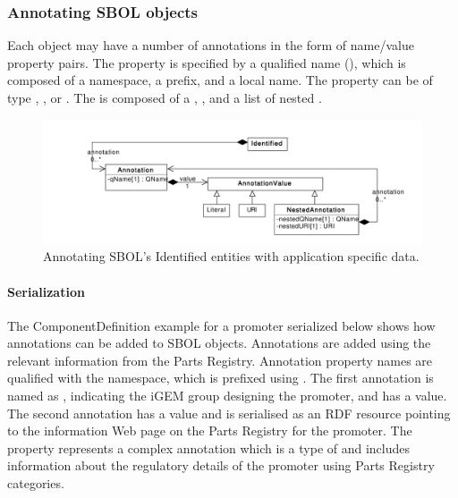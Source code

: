 \subsubsection{Annotating SBOL objects}

Each  object may have a number of annotations in the form of name/value property pairs. The  property is specified by a qualified name (), which is composed of a namespace, a prefix, and a local name. The  property can be of type , , or . The  is composed of a , , and a list of nested .


\begin{figure}[!ht]
\begin{center}
\includegraphics[scale=0.6]{uml/identified_annotations}
\caption[]{Annotating SBOL's Identified entities with application specific data.}
\label{uml:identified_annotations}
\end{center}
\end{figure}

\paragraph{Serialization}
The ComponentDefinition example for a promoter serialized below shows how annotations can be added to SBOL objects. Annotations are added using the relevant information from the Parts Registry. Annotation property names are qualified with the  namespace, which is prefixed using . The first annotation is named as , indicating the iGEM group designing the promoter, and has a  value. The second  annotation has a  value and is serialised as an RDF resource pointing to the information Web page on the Parts Registry for the promoter. The   property represents a complex annotation which is a type of  and includes information about the regulatory details of the promoter using Parts Registry categories.   

